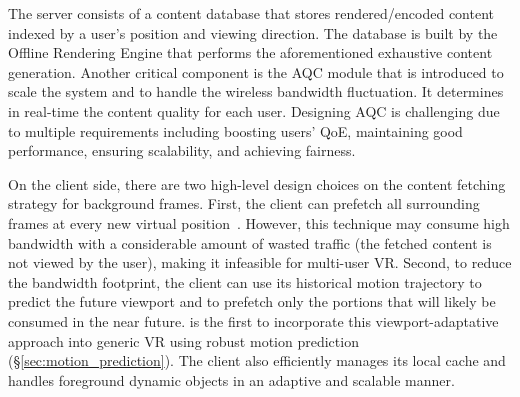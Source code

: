 The server consists of a content database that stores rendered/encoded content indexed by a user's position and viewing direction. The database is built by the Offline Rendering Engine that performs the aforementioned exhaustive content generation.
%
Another critical component is the AQC module that is introduced to scale the system and to handle the wireless bandwidth fluctuation. It determines in real-time the content quality for each user.
%
Designing AQC is challenging due to multiple requirements including boosting users' QoE, maintaining good performance, ensuring scalability, and achieving fairness.

On the client side, there are two high-level design choices on the content fetching strategy for background frames.
First, the client can prefetch all surrounding frames at every new virtual position~\cite{lai2019furion}.
However, this technique may consume high bandwidth with a considerable amount of wasted traffic (\ie the fetched content is not viewed by the user), making it infeasible for multi-user VR.
%
Second, to reduce the bandwidth footprint, the client can use its historical motion trajectory to predict the future viewport and to
prefetch only the portions that will likely be consumed in the near future. \firefly is the first to incorporate this viewport-adaptative approach into generic VR using robust motion prediction (\S\ref{sec:motion_prediction}).
The client also efficiently manages its local cache and handles foreground dynamic objects in an adaptive and scalable manner.

